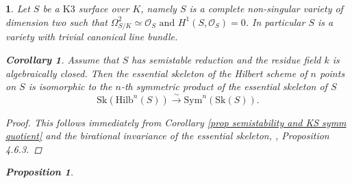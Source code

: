 \documentclass{amsart}%
\numberwithin{equation}{subsection}
\theoremstyle{plain2}
\newtheorem{cor}[equation]{Corollary}
\newtheorem{prop}[equation]{Proposition}
\theoremstyle{definition2}
\theoremstyle{stepstyle}
\theoremstyle{point}
\theoremstyle{subpoint}
\newtheorem{subpoint}[equation]{}%
\newcommand{\spa}[1]{\begin{subpoint}#1\end{subpoint}}           %
\newcommand{\caO}{\ensuremath{\mathcal{O}}}
\newcommand{\Hilb}{\ensuremath{\mathrm{Hilb}}}
\newcommand{\Sk}{\mathrm{Sk}}
\begin{document}
\spa{Let $S$ be a $\text{K}3$ surface over $K$, namely $S$ is a complete non-singular variety of dimension two such that $\Omega_{S/K}^2 \simeq \caO_S \text{ and } H^1(S,\caO_S) = 0$. In particular $S$ is a variety with trivial canonical line bundle. 
\begin{cor}  \label{cor essential skeleton hilb}
Assume that $S$ has  semistable reduction and the residue field $k$ is algebraically closed. Then the essential skeleton of the Hilbert scheme of $n$ points on $S$ is isomorphic to the $n$-th symmetric product of the essential skeleton of $S$ $$\Sk(\Hilb^n(S)) \xrightarrow{\sim} \text{Sym}^n(\Sk(S)).$$ 
\end{cor}
\begin{proof}
This follows immediately from Corollary \ref{prop semistability and KS symm quotient} and the birational invariance of the essential skeleton, \cite{MustataNicaise}, Proposition 4.6.3.
\end{proof}
\begin{prop} \label{prop top essential skeleton Hilb}

\end{prop}}
\end{document}
